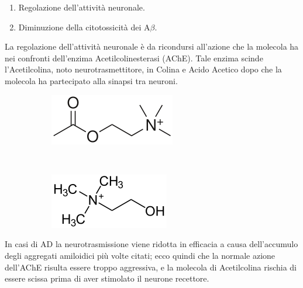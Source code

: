 \documentclass[a4paper, 12pt]{article}
\begin{document}
\begin{enumerate}
	\item Regolazione dell'attività neuronale.
	\item Diminuzione della citotossicità dei A$\beta$.
\end{enumerate}

La regolazione dell'attività neuronale è da ricondursi all'azione che la molecola ha nei confronti dell'enzima Acetilcolinesterasi (AChE). Tale enzima scinde l'Acetilcolina, noto neurotrasmettitore, in Colina e Acido Acetico dopo che la molecola ha partecipato alla sinapsi tra neuroni.

\begin{figure}[H]
	\centering
	\begin{subfigure}[b]{0.3\linewidth}
		\includegraphics[width=\linewidth]{immagini/acetilcolina.png}
	\end{subfigure}
	~
	\begin{subfigure}[b]{0.3\linewidth}
		\includegraphics[width=\linewidth]{immagini/colina.png}
	\end{subfigure}
	\label{fig:coline}
\end{figure}

In casi di AD la neurotrasmissione viene ridotta in efficacia a causa dell'accumulo degli aggregati amiloidici più volte citati; ecco quindi che la normale azione dell'AChE risulta essere troppo aggressiva, e la molecola di Acetilcolina rischia di essere scissa prima di aver stimolato il neurone recettore.
\end{document}
